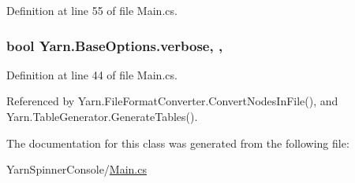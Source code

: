 Definition at line 55 of file Main.\-cs.

\hypertarget{a00031_ada4d83d1756918f362d55f6649b82b17}{
\subsubsection[{verbose}]{\setlength{\rightskip}{0pt plus 5cm}bool Yarn.\-Base\-Options.\-verbose\hspace{0.3cm}{\ttfamily [get]}, {\ttfamily [set]}, {\ttfamily [inherited]}}}\label{a00031_ada4d83d1756918f362d55f6649b82b17}


Definition at line 44 of file Main.\-cs.



Referenced by Yarn.\-File\-Format\-Converter.\-Convert\-Nodes\-In\-File(), and Yarn.\-Table\-Generator.\-Generate\-Tables().



The documentation for this class was generated from the following file\-:\begin{DoxyCompactItemize}
\item 
Yarn\-Spinner\-Console/\hyperlink{a00307}{Main.\-cs}\end{DoxyCompactItemize}
